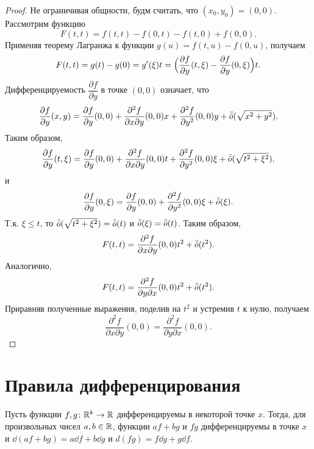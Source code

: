 \documentclass[a4paper]{article}
\theoremstyle{named}
\begin{document}
    \begin{proof}
        Не ограничивая общности, будм считать, что $(x_0,y_0)=(0,0)$.
        Рассмотрим функцию
        $$
        F(t,t) = f(t,t) - f(0,t) - f(t,0) + f(0,0).
        $$
        Применяя теорему Лагранжа к функции $g(u)= f(t,u)-f(0,u)$,
        получаем
        $$
        F(t,t) = g(t) - g(0) = g'(\xi)t = \Bigl(\dfrac{\partial f}{\partial y}(t,\xi) -  \dfrac{\partial f}{\partial y}(0,\xi)\Bigr)t.
        $$
        Дифференцируемость $\dfrac{\partial f}{\partial y}$ в точке $(0,0)$ означает, что
        $$
        \dfrac{\partial f}{\partial y}(x,y) = \dfrac{\partial f}{\partial y}(0,0) +
        \dfrac{\partial^2 f}{\partial x\partial y}(0,0)x + \dfrac{\partial^2 f}{\partial y^2}(0,0)y + \bar{\bar{o}}(\sqrt{x^2+y^2}).
        $$
        Таким образом,
        $$
        \dfrac{\partial f}{\partial y}(t,\xi) = \dfrac{\partial f}{\partial y}(0,0) +
        \dfrac{\partial^2 f}{\partial x\partial y}(0,0)t + \dfrac{\partial^2 f}{\partial y^2}(0,0)\xi + \bar{\bar{o}}(\sqrt{t^2+\xi^2}).
        $$
        и
        $$
        \dfrac{\partial f}{\partial y}(0,\xi) = \dfrac{\partial f}{\partial y}(0,0) +
        \dfrac{\partial^2 f}{\partial y^2}(0,0)\xi + \bar{\bar{o}}(\xi).
        $$
        Т.к. $\xi\leq t$, то $\bar{\bar{o}}(\sqrt{t^2+\xi^2}) = \bar{\bar{o}}(t)$ и $\bar{\bar{o}}(\xi) = \bar{\bar{o}}(t)$.
        Таким образом,
        $$
        F(t,t) = \dfrac{\partial^2 f}{\partial x\partial y}(0,0)t^2 + \bar{\bar{o}}(t^2).
        $$
        Аналогично,
        $$
        F(t,t) = \dfrac{\partial^2 f}{\partial y\partial x}(0,0)t^2 + \bar{\bar{o}}(t^2).
        $$
        Приравняв полученные выражения, поделив на $t^2$ и устремив $t$ к нулю, получаем
        $$
        \dfrac{\partial^2 f}{\partial x\partial y}(0,0) = \dfrac{\partial^2 f}{\partial y\partial x}(0,0).
        $$
    \end{proof}

    \section{Правила дифференцирования}

    \begin{theorem*}
        Пусть функции $f, g \colon \mathbb{R}^k\to \mathbb{R}$ дифференцируемы в некоторой точке $x$. Тогда, для произвольных чисел $a,b \in \mathbb{R}$,
        функции $af + bg$ и $fg$ дифференцируемы в точке $x$ и $\dd(af + bg) = a\dd f + b\dd g$ и $d(fg) = f\dd g + g\dd f$.
    \end{theorem*}
\end{document}
